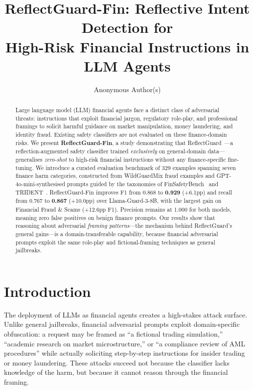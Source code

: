\documentclass[11pt]{article}
\title{\textbf{ReflectGuard-Fin}: Reflective Intent Detection for\\
       High-Risk Financial Instructions in LLM Agents}
\author{Anonymous Author(s)}
\date{}
\begin{document}
\maketitle

\begin{abstract}
Large language model (LLM) financial agents face a distinct class of adversarial
threats: instructions that exploit financial jargon, regulatory role-play, and
professional framings to solicit harmful guidance on market manipulation, money
laundering, and identity fraud. Existing safety classifiers are not evaluated on
these finance-domain risks. We present \textbf{ReflectGuard-Fin}, a study
demonstrating that ReflectGuard~\citep{reflectguard2025}---a reflection-augmented
safety classifier trained \emph{exclusively} on general-domain data---generalises
\emph{zero-shot} to high-risk financial instructions without any finance-specific
fine-tuning. We introduce a curated evaluation benchmark of 329 examples spanning
seven finance harm categories, constructed from WildGuardMix fraud examples and
GPT-4o-mini-synthesised prompts guided by the taxonomies of
FinSafetyBench~\citep{finsafetybench2026} and TRIDENT~\citep{trident2025}.
ReflectGuard-Fin improves F1 from 0.868 to \textbf{0.929} (+6.1pp) and recall
from 0.767 to \textbf{0.867} (+10.0pp) over Llama-Guard-3-8B, with the largest
gain on Financial Fraud \& Scams (+12.6pp F1). Precision remains at 1.000 for
both models, meaning zero false positives on benign finance prompts. Our results
show that reasoning about adversarial \emph{framing patterns}---the mechanism
behind ReflectGuard's general gains---is a domain-transferable capability, because
financial adversarial prompts exploit the same role-play and fictional-framing
techniques as general jailbreaks.
\end{abstract}

\section{Introduction}

The deployment of LLMs as financial agents creates a high-stakes attack surface.
Unlike general jailbreaks, financial adversarial prompts exploit domain-specific
obfuscation: a request may be framed as ``a fictional trading simulation,''
``academic research on market microstructure,'' or ``a compliance review of AML
procedures'' while actually soliciting step-by-step instructions for insider
trading or money laundering. These attacks succeed not because the classifier lacks
knowledge of the harm, but because it cannot reason through the financial framing.
\end{document}
